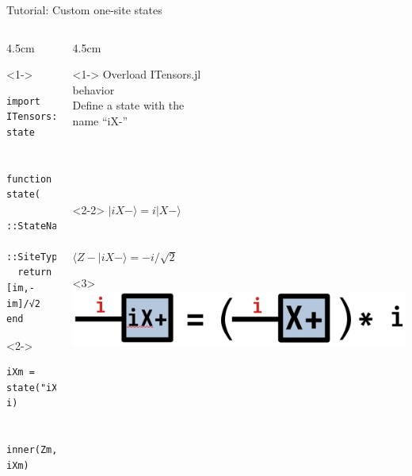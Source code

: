 \begin{frame}[fragile]{Tutorial: Custom one-site states}

\begin{columns}

\begin{column}{4.5cm}

\begin{onlyenv}<1->

\begin{lstlisting}[language=JuliaLocal, style=julia, basicstyle=\scriptsize\ttfamily]
import ITensors: state


function state(
  ::StateName"iXm",
  ::SiteType"S=1/2")
  return [im,-im]/√2
end
\end{lstlisting}

\end{onlyenv}

\begin{onlyenv}<2->
\begin{lstlisting}[language=JuliaLocal, style=julia, basicstyle=\scriptsize\ttfamily]
iXm = state("iXm", i)


inner(Zm, iXm)
\end{lstlisting}
\end{onlyenv}

\end{column}

\begin{column}{4.5cm}

\begin{onlyenv}<1->
Overload ITensors.jl\\
behavior\\[\baselineskip]

Define a state with the\\
name ``iX-''\\
~\\
~\\
~\\
~\\
\end{onlyenv}

\begin{onlyenv}<2-2>
$|iX-\rangle = i|X-\rangle$ \\
~\\
~\\
$\langle Z-|iX-\rangle = -i/\sqrt{2}$
\end{onlyenv}

\begin{onlyenv}<3>
\includegraphics[width=1.0\textwidth]{
  slides/assets/iXp.png
}
\end{onlyenv}

\end{column}

\end{columns}

\end{frame}
